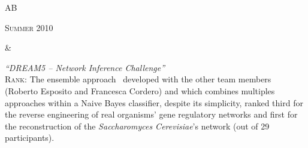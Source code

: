 \documentclass[a4paper,10pt]{article}
\newenvironment{doubletablelist}
{
	\vspace{-0.2cm}
	\begin{longtable}[!h]{AB}}{\end{longtable}
}
\newcommand{\dtlist}[2]{
\hspace{-3cm}
\noindent
	\begin{minipage}{0.22\textwidth}
	\begin{flushright}
	\textsc{#1}
	\end{flushright}
	\end{minipage}
	& #2\\[0.2cm]
}
\begin{document}
\begin{doubletablelist}
\dtlist{Summer 2010}{\begin{minipage}[t]{0.65\textwidth}
			\emph{``DREAM5 -- Network Inference Challenge''}\\
			\textsc{Rank:}  The ensemble approach~\cite{Vis11b,Mar12} developed with the other team members (Roberto Esposito and Francesca Cordero) and which combines multiples approaches within a Naive Bayes classifier, despite its simplicity, ranked third for the reverse engineering of real organisms' gene regulatory networks and first for the reconstruction of the \emph{Saccharomyces Cerevisiae}'s network (out of 29 participants). 
		\end{minipage}}
\end{doubletablelist}





\vspace{0.2cm}
\end{document}
